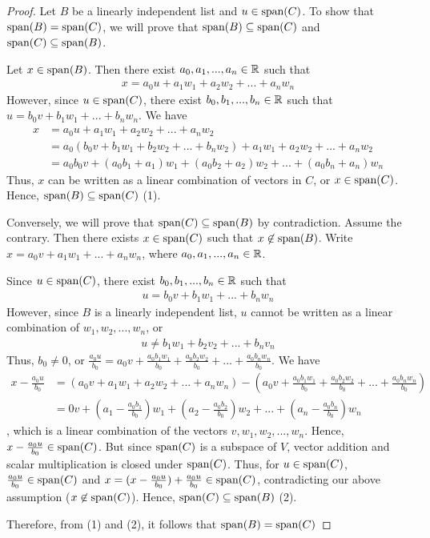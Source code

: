 \begin{proof}
    Let $B$ be a linearly independent list and $u\in\textnormal{span}(C)$. To show that $\textnormal{span}(B)=\textnormal{span}(C)$, we will prove that $\textnormal{span}(B)\subseteq\textnormal{span}(C)$ and $\textnormal{span}(C)\subseteq\textnormal{span}(B)$. 

    Let $x\in\textnormal{span}(B)$. Then there exist $a_0,a_1,...,a_n\in\mathbb R$ such that 
    \[
        \begin{aligned}
            x=a_0u+a_1w_1+a_2w_2+...+a_nw_n
        \end{aligned}
    \]
    However, since $u\in\textnormal{span}(C)$, there exist $b_0,b_1,...,b_n\in\mathbb R$ such that $u=b_0v+b_1w_1+...+b_nw_n$. We have 
    \[
        \begin{aligned}
            x &= a_0u+a_1w_1+a_2w_2+...+a_nw_2\\
              &= a_0(b_0v+b_1w_1+b_2w_2+...+b_nw_2)+a_1w_1+a_2w_2+...+a_nw_2\\
              &= a_0b_0v+(a_0b_1+a_1)w_1+(a_0b_2+a_2)w_2+...+(a_0b_n+a_n)w_n
        \end{aligned}
    \]
    Thus, $x$ can be written as a linear combination of vectors in $C$, or $x\in\textnormal{span}(C)$. Hence, $\textnormal{span}(B)\subseteq\textnormal{span}(C)$ (1).

    Conversely, we will prove that $\textnormal{span}(C)\subseteq\textnormal{span}(B)$ by contradiction. Assume the contrary. Then there exists $x\in\textnormal{span}(C)$ such that $x\not\in\textnormal{span}(B)$. Write $x=a_0v+a_1w_1+...+a_nw_n$, where $a_0,a_1,...,a_n\in\mathbb R$.

    Since $u\in\textnormal{span}(C)$, there exist $b_0,b_1,...,b_n\in\mathbb R$ such that 
    \[
        \begin{aligned}
            u=b_0v+b_1w_1+...+b_nw_n
        \end{aligned}
    \]
    However, since $B$ is a linearly independent list, $u$ cannot be written as a linear combination of $w_1,w_2,...,w_n$, or 
    \[
        \begin{aligned}
            u\not=b_1w_1+b_2v_2+...+b_nv_n
        \end{aligned}
    \]
    Thus, $b_0\not=0$, or $\frac{a_0u}{b_0}=a_0v+\frac{a_0b_1w_1}{b_0}+\frac{a_0b_2w_2}{b_0}+...+\frac{a_0b_nw_n}{b_0}$. We have 
    \[
        \begin{aligned}
            x-\frac{a_0u}{b_0} &= (a_0v+a_1w_1+a_2w_2+...+a_nw_n)-(a_0v+\frac{a_0b_1w_1}{b_0}+\frac{a_0b_2w_2}{b_0}+...+\frac{a_0b_nw_n}{b_0})\\
                               &= 0v+(a_1-\frac{a_0b_1}{b_0})w_1+(a_2-\frac{a_0b_2}{b_0})w_2+...+(a_n-\frac{a_0b_n}{b_0})w_n
        \end{aligned}
    \]  
    , which is a linear combination of the vectors $v,w_1,w_2,...,w_n$. Hence, $x-\frac{a_0u}{b_0}\in\textnormal{span}(C)$. But since $\textnormal{span}(C)$ is a subspace of $V$, vector addition and scalar multiplication is closed under $\textnormal{span}(C)$. Thus, for $u\in\textnormal{span}(C)$, $\frac{a_0u}{b_0}\in\textnormal{span}(C)$ and $x=(x-\frac{a_0u}{b_0})+\frac{a_0u}{b_0}\in\textnormal{span}(C)$, contradicting our above assumption ($x\not\in\textnormal{span}(C)$). Hence, $\textnormal{span}(C)\subseteq\textnormal{span}(B)$ (2).

    Therefore, from (1) and (2), it follows that $\textnormal{span}(B)=\textnormal{span}(C)$
\end{proof}